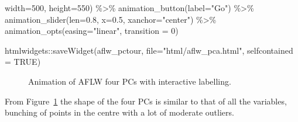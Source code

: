 \documentclass[
  letterpaper,
]{book}
\newenvironment{Shaded}{\begin{snugshade}}{\end{snugshade}}
\newcommand{\AttributeTok}[1]{\textcolor[rgb]{0.40,0.45,0.13}{#1}}
\newcommand{\ConstantTok}[1]{\textcolor[rgb]{0.56,0.35,0.01}{#1}}
\newcommand{\DecValTok}[1]{\textcolor[rgb]{0.68,0.00,0.00}{#1}}
\newcommand{\FloatTok}[1]{\textcolor[rgb]{0.68,0.00,0.00}{#1}}
\newcommand{\FunctionTok}[1]{\textcolor[rgb]{0.28,0.35,0.67}{#1}}
\newcommand{\NormalTok}[1]{\textcolor[rgb]{0.00,0.23,0.31}{#1}}
\newcommand{\SpecialCharTok}[1]{\textcolor[rgb]{0.37,0.37,0.37}{#1}}
\newcommand{\StringTok}[1]{\textcolor[rgb]{0.13,0.47,0.30}{#1}}
\begin{document}
\begin{Shaded}
\begin{Highlighting}[]
                        \AttributeTok{width=}\DecValTok{500}\NormalTok{,}
                        \AttributeTok{height=}\DecValTok{550}\NormalTok{) }\SpecialCharTok{\%\textgreater{}\%}
       \FunctionTok{animation\_button}\NormalTok{(}\AttributeTok{label=}\StringTok{"Go"}\NormalTok{) }\SpecialCharTok{\%\textgreater{}\%}
       \FunctionTok{animation\_slider}\NormalTok{(}\AttributeTok{len=}\FloatTok{0.8}\NormalTok{, }\AttributeTok{x=}\FloatTok{0.5}\NormalTok{,}
                        \AttributeTok{xanchor=}\StringTok{"center"}\NormalTok{) }\SpecialCharTok{\%\textgreater{}\%}
       \FunctionTok{animation\_opts}\NormalTok{(}\AttributeTok{easing=}\StringTok{"linear"}\NormalTok{, }\AttributeTok{transition =} \DecValTok{0}\NormalTok{)}

\NormalTok{htmlwidgets}\SpecialCharTok{::}\FunctionTok{saveWidget}\NormalTok{(aflw\_pctour,}
          \AttributeTok{file=}\StringTok{"html/aflw\_pca.html"}\NormalTok{,}
          \AttributeTok{selfcontained =} \ConstantTok{TRUE}\NormalTok{)}
\end{Highlighting}
\end{Shaded}

\begin{figure}

{\centering 

}

\caption{\label{fig-aflw-pcatour}Animation of AFLW four PCs with
interactive labelling.}

\end{figure}

From Figure~\ref{fig-aflw-pcatour} the shape of the four PCs is similar
to that of all the variables, bunching of points in the centre with a
lot of moderate outliers.
\end{document}
